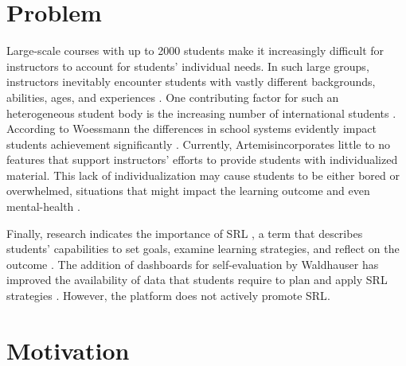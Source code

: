 \documentclass[a4paper,12pt,twoside]{article}
\begin{document}
\section{Problem}

Large-scale courses with up to 2000 students make it increasingly difficult for instructors to account for students' individual needs. In such large groups,
instructors inevitably encounter students with vastly different backgrounds, abilities, ages, and experiences \cite{mulryan2010teaching}.
One contributing factor for such an heterogeneous student body is the increasing number of international students \cite{oecd2011}. According to
Woessmann the differences in school systems evidently impact students achievement significantly \cite{woessmann2016importance}.
Currently, Artemisincorporates little to no features that support instructors' efforts to provide students with individualized material. This lack
of individualization may cause students to be either bored or overwhelmed, situations that might impact the learning outcome and even mental-health
\cite{graciani2020m, kadison2004college}.

Finally, research indicates the importance of \ac{SRL} \cite{bjork2013self}, a term that describes students' capabilities to set goals, examine learning
strategies, and reflect on the outcome \cite{butler1995feedback}. The addition of dashboards for self-evaluation by Waldhauser has improved the availability
of data that students require to plan and apply \ac{SRL} strategies \cite{waldhauser2021}. However, the platform does not actively promote \ac{SRL}.


\section{Motivation}
\end{document}
